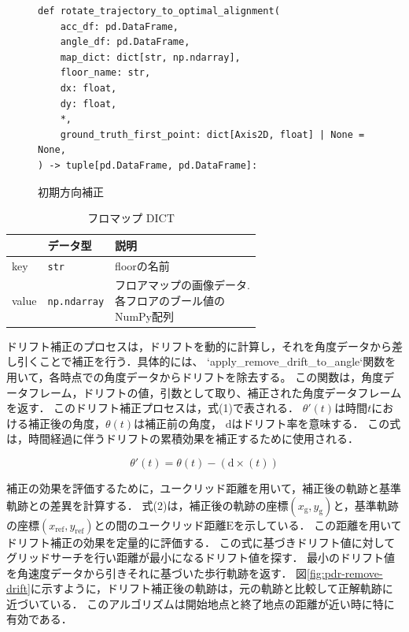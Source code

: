 \documentclass[Japanese]{dicomopapers}
\begin{document}
\begin{figure}[ht]
	\begin{lstlisting}
def rotate_trajectory_to_optimal_alignment(
    acc_df: pd.DataFrame,
    angle_df: pd.DataFrame,
    map_dict: dict[str, np.ndarray],
    floor_name: str,
    dx: float,
    dy: float,
    *,
    ground_truth_first_point: dict[Axis2D, float] | None = None,
) -> tuple[pd.DataFrame, pd.DataFrame]:
\end{lstlisting}
	\caption{初期方向補正}
	\label{lst:remove-drift}
\end{figure}

\begin{table}[ht]
	\centering
	\label{tab:map_dict}
	\begin{tabular}{lll}
		\hline
		      & \textbf{データ型}       & \textbf{説明}             \\ \hline
		key   & \texttt{str}        & floorの名前                \\ \hline
		value & \texttt{np.ndarray} & \makecell{フロアマップの画像データ. \\各フロアのブール値の\\NumPy配列} \\ \hline
	\end{tabular}
	\caption{フロマップ DICT}
\end{table}

ドリフト補正のプロセスは，ドリフトを動的に計算し，それを角度データから差し引くことで補正を行う．具体的には、
`apply\_remove\_drift\_to\_angle`関数を用いて，各時点での角度データからドリフトを除去する。
この関数は，角度データフレーム，ドリフトの値，引数として取り、補正された角度データフレームを返す．
このドリフト補正プロセスは，式(1)で表される．
$\theta'(t)$は時間$t$における補正後の角度，$\theta(t)$は補正前の角度，
$\mathrm{d}$はドリフト率を意味する．
この式は，時間経過に伴うドリフトの累積効果を補正するために使用される．

\vspace{5mm} %

\begin{equation}
	\theta'(t) = \theta(t) - (\mathrm{d} \times (t))
\end{equation}

\vspace{5mm} %

補正の効果を評価するために，ユークリッド距離を用いて，補正後の軌跡と基準軌跡との差異を計算する．
式(2)は，補正後の軌跡の座標$(x_{\mathrm{g}}, y_{\mathrm{g}})$と，基準軌跡の座標$(x_{\mathrm{ref}}, y_{\mathrm{ref}})$との間のユークリッド距離$\mathrm{E}$を示している．
この距離を用いてドリフト補正の効果を定量的に評価する．
この式に基づきドリフト値に対してグリッドサーチを行い距離が最小になるドリフト値を探す．
最小のドリフト値を角速度データから引きそれに基づいた歩行軌跡を返す．
図\ref{fig:pdr-remove-drift}に示すように，ドリフト補正後の軌跡は，元の軌跡と比較して正解軌跡に近づいている．
このアルゴリズムは開始地点と終了地点の距離が近い時に特に有効である．
\end{document}

